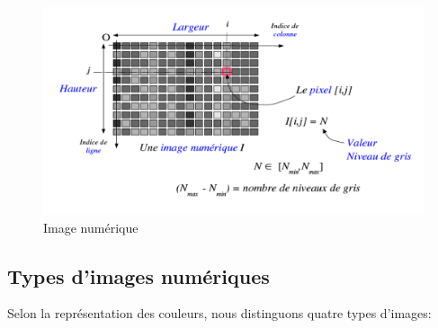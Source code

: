 \documentclass[a4paper,12pt]{report}
\begin{document}
\begin{figure}[!ht]
 	\centering
	\includegraphics[scale=0.5]{ImageNum}
	\caption{Image numérique} \label{fig:ImageNum}
\end{figure}

\subsection{Types d'images numériques}
Selon la représentation des couleurs, nous distinguons quatre types d'images:

\end{document}
